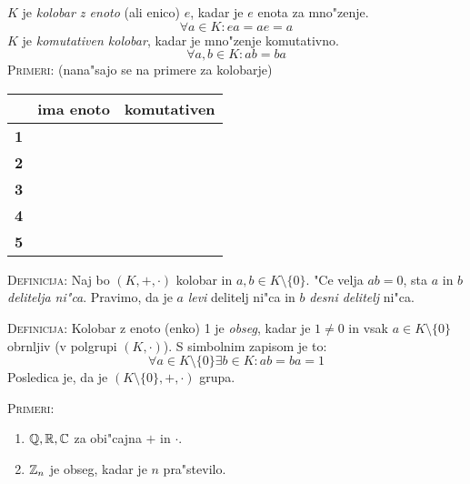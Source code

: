 %
$K$ je \emph{kolobar z enoto} (ali enico) $e$, kadar je $e$ enota za mno"zenje.
\begin{equation*}
\forall a \in K: ea = ae = a
\end{equation*}
$K$ je \emph{komutativen kolobar}, kadar je mno"zenje komutativno.
\begin{equation*}
\forall a, b \in K: ab = ba
\end{equation*}
\textsc{Primeri:} (nana"sajo se na primere za kolobarje)
\begin{table}[!htbp]
	\centering
	\begin{tabular}{c|cc}
		& \textbf{ima enoto} & \textbf{komutativen} \\ \hline
		\textbf{1} & \cmark & \cmark \\
		\textbf{2} & \cmark & \cmark \\
		\textbf{3} & \xmark & \xmark \\
		\textbf{4} & \xmark & \cmark \\
		\textbf{5} & \cmark & \cmark
	\end{tabular}
\end{table}

\textsc{Definicija:} Naj bo $(K, +, \cdot)$ kolobar in $a, b \in K \setminus \{0\}$. "Ce velja $ab = 0$, sta $a$ in $b$ \emph{delitelja ni"ca}. Pravimo, da je $a$ \emph{levi} delitelj ni"ca in $b$ \emph{desni delitelj} ni"ca.

\textsc{Definicija:} Kolobar z enoto (enko) 1 je \emph{obseg}, kadar je $1 \neq 0$ in vsak $a \in K \setminus \{0\}$ obrnljiv (v polgrupi $(K, \cdot)$). S simbolnim zapisom je to:
\begin{equation*}
\forall a \in K \setminus \{0\} \exists b \in K: ab = ba = 1
\end{equation*}
Posledica je, da je $(K \setminus \{0\}, +, \cdot)$ grupa.

\textsc{Primeri:}
\begin{enumerate}[(1)]
	\item $\mathbb{Q}, \mathbb{R}, \mathbb{C}$ za obi"cajna $+$ in $\cdot$.
	\item $\mathbb{Z}_n$ je obseg, kadar je $n$ pra"stevilo.
\end{enumerate}